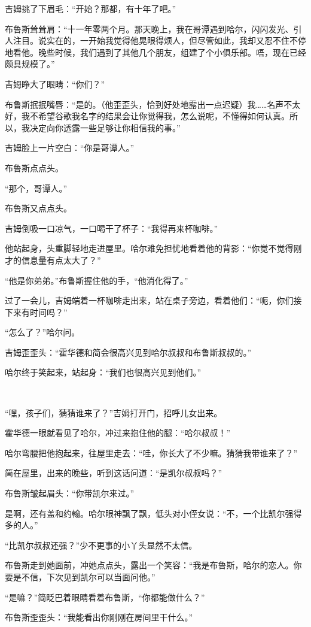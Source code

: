 \documentclass[../main]{subfiles}
\begin{document}
吉姆挑了下眉毛：“开始？那都，有十年了吧。”

布鲁斯耸耸肩：“十一年零两个月。那天晚上，我在哥谭遇到哈尔，闪闪发光、引人注目。说实在的，一开始我觉得他晃眼得烦人，但尽管如此，我却又忍不住不停地看他。晚些时候，我们遇到了其他几个朋友，组建了个小俱乐部。唔，现在已经颇具规模了。”

吉姆睁大了眼睛：“你们？”

布鲁斯抿抿嘴唇：“是的。（他歪歪头，恰到好处地露出一点迟疑）我……名声不太好，我不希望谷歌我名字的结果会让你觉得我，怎么说呢，不懂得如何认真。所以，我决定向你透露一些足够让你相信我的事。”

吉姆脸上一片空白：“你是哥谭人。”

布鲁斯点点头。

“那个，哥谭人。”

布鲁斯又点点头。

吉姆倒吸一口凉气，一口喝干了杯子：“我得再来杯咖啡。”

他站起身，头重脚轻地走进屋里。哈尔难免担忧地看着他的背影：“你觉不觉得刚才的信息量有点太大了？”

“他是你弟弟。”布鲁斯握住他的手，“他消化得了。”

过了一会儿，吉姆端着一杯咖啡走出来，站在桌子旁边，看着他们：“呃，你们接下来有时间吗？”

“怎么了？”哈尔问。

吉姆歪歪头：“霍华德和简会很高兴见到哈尔叔叔和布鲁斯叔叔的。”

哈尔终于笑起来，站起身：“我们也很高兴见到他们。”

~\

“嘿，孩子们，猜猜谁来了？”吉姆打开门，招呼儿女出来。

霍华德一眼就看见了哈尔，冲过来抱住他的腿：“哈尔叔叔！”

哈尔弯腰把他抱起来，往屋里走去：“哇，你长大了不少嘛。猜猜我带谁来了？”

简在屋里，出来的晚些，听到这话问道：“是凯尔叔叔吗？”

布鲁斯皱起眉头：“你带凯尔来过。”

是啊，还有盖和约翰。哈尔眼神飘了飘，低头对小侄女说：“不，一个比凯尔强得多的人。”

“比凯尔叔叔还强？”少不更事的小丫头显然不太信。

布鲁斯走到她面前，冲她点点头，露出一个笑容：“我是布鲁斯，哈尔的恋人。你要是不信，下次见到凯尔可以当面问他。”

“是嘛？”简眨巴着眼睛看着布鲁斯，“你都能做什么？”

布鲁斯歪歪头：“我能看出你刚刚在房间里干什么。”
\end{document}
